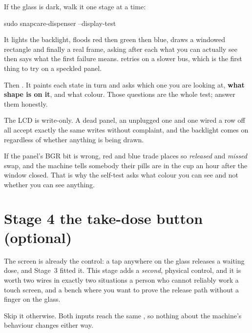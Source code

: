 \documentclass[11pt]{article}
\begin{document}
\begin{provebox}
\provetitle
If the glass is dark, walk it one stage at a time:
\begin{shell}
sudo snapcare-dispenser --display-test
\end{shell}
It lights the backlight, floods red then green then blue, draws a windowed
rectangle and finally a real frame, asking after each what you can actually see
\textemdash{} then says what the first failure means. 
retries on a slower bus, which is the first thing to try on a speckled panel.

Then . It paints each state in turn and asks which one you are
looking at, \textbf{what shape is on it}, and what colour. Those questions are
the whole test; answer them honestly.
\end{provebox}

\vspace{1mm}
\begin{dangerbox}
The LCD is write-only. A dead panel, an unplugged one and one wired a row off
all accept exactly the same writes without complaint, and the backlight comes on
regardless of whether anything is being drawn.

\vspace{1ex}
If the panel's BGR bit is wrong, red and blue trade places \textemdash{} so
\emph{released} and \emph{missed} swap, and the machine tells somebody their
pills are in the cup an hour after the window closed. That is why the self-test
asks what colour you can see and not whether you can see anything.
\end{dangerbox}

\clearpage

\section{Stage 4 \textemdash{} the take-dose button (optional)}

The screen is already the control: a tap anywhere on the glass releases a
waiting dose, and Stage~3 fitted it. This stage adds a \emph{second}, physical
control, and it is worth two wires in exactly two situations \textemdash{} a
person who cannot reliably work a touch screen, and a bench where you want to
prove the release path without a finger on the glass.

Skip it otherwise. Both inputs reach the same , so nothing about
the machine's behaviour changes either way.
\end{document}
